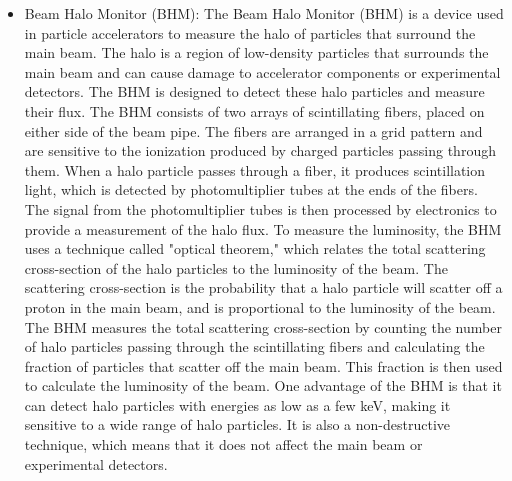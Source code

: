 \begin{itemize}

\item Beam Halo Monitor (BHM):  The Beam Halo Monitor (BHM) is a device used in particle accelerators to measure the halo of particles that surround the main beam. The halo is a region of low-density particles that surrounds the main beam and can cause damage to accelerator components or experimental detectors. The BHM is designed to detect these halo particles and measure their flux. The BHM consists of two arrays of scintillating fibers, placed on either side of the beam pipe. The fibers are arranged in a grid pattern and are sensitive to the ionization produced by charged particles passing through them. When a halo particle passes through a fiber, it produces scintillation light, which is detected by photomultiplier tubes at the ends of the fibers. The signal from the photomultiplier tubes is then processed by electronics to provide a measurement of the halo flux. To measure the luminosity, the BHM uses a technique called "optical theorem," which relates the total scattering cross-section of the halo particles to the luminosity of the beam. The scattering cross-section is the probability that a halo particle will scatter off a proton in the main beam, and is proportional to the luminosity of the beam. The BHM measures the total scattering cross-section by counting the number of halo particles passing through the scintillating fibers and calculating the fraction of particles that scatter off the main beam. This fraction is then used to calculate the luminosity of the beam. One advantage of the BHM is that it can detect halo particles with energies as low as a few keV, making it sensitive to a wide range of halo particles. It is also a non-destructive technique, which means that it does not affect the main beam or experimental detectors.


\end{itemize}
